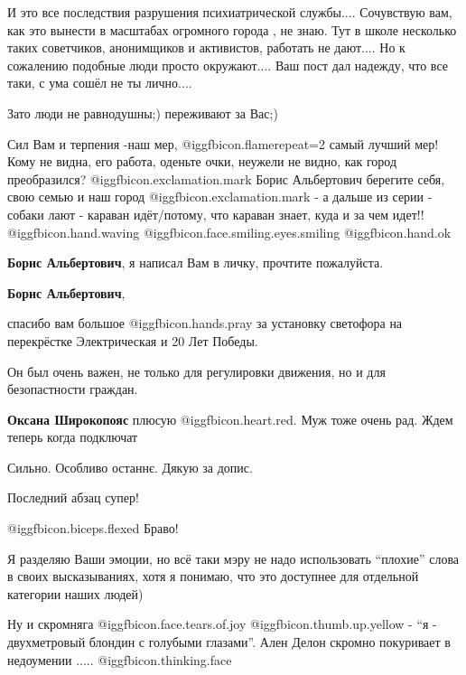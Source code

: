 \begin{itemize}
И это все последствия разрушения психиатрической службы.... Сочувствую вам, как
это вынести в масштабах огромного города , не знаю. Тут в школе несколько таких
советчиков, анонимщиков и активистов, работать не дают.... Но к сожалению
подобные люди просто окружают.... Ваш пост дал надежду, что все таки, с ума
сошёл не ты лично....

Зато люди не равнодушны;) переживают за Вас;)


Сил Вам и терпения -наш мер, @igg{fbicon.flame}{repeat=2} самый лучший мер! Кому не видна, его
работа, оденьте очки, неужели не видно, как город преобразился? @igg{fbicon.exclamation.mark} Борис Альбертович
берегите себя, свою семью и наш город @igg{fbicon.exclamation.mark} - а дальше из серии  - собаки лают -
караван идёт/потому, что караван знает, куда и за чем идет!! @igg{fbicon.hand.waving}  @igg{fbicon.face.smiling.eyes.smiling}  @igg{fbicon.hand.ok} 

\textbf{Борис Альбертович}, я написал Вам в личку, прочтите пожалуйста.

\textbf{Борис Альбертович}, 

спасибо вам большое  @igg{fbicon.hands.pray} за установку светофора на
перекрёстке Электрическая и 20 Лет Победы.

Он был очень важен, не только для регулировки движения, но и для безопастности
граждан.

\begin{itemize} %
\textbf{Оксана Широкопояс} плюсую @igg{fbicon.heart.red}. Муж тоже очень рад.
Ждем теперь когда подключат
\end{itemize} %

Сильно. Особливо останнє. Дякую за допис.

Последний абзац супер!

 @igg{fbicon.biceps.flexed} Браво!


Я разделяю Ваши эмоции, но всё таки мэру не надо использовать \enquote{плохие} слова в
своих высказываниях, хотя я понимаю, что это доступнее для отдельной категории
наших людей)



Ну и скромняга  @igg{fbicon.face.tears.of.joy}  @igg{fbicon.thumb.up.yellow}  - \enquote{я - двухметровый блондин с голубыми глазами}.
Ален Делон скромно покуривает в недоумении ..... @igg{fbicon.thinking.face} 


\end{itemize} %
